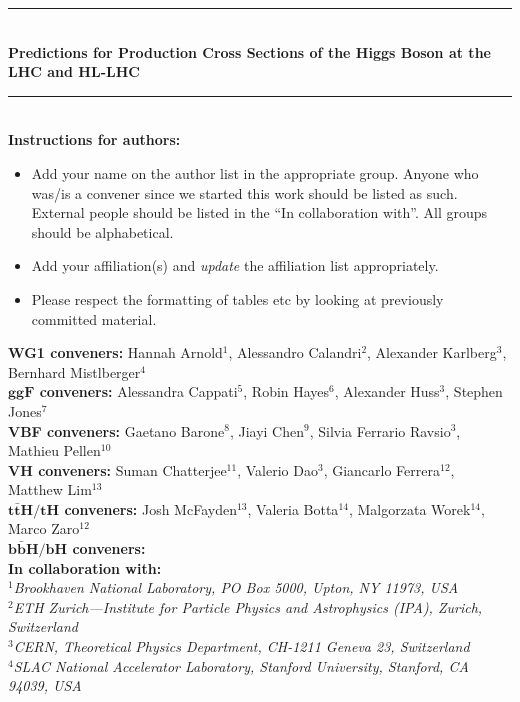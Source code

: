 \documentclass[11pt]{article}
\newcommand{\HRule}{\rule{\linewidth}{0.5mm}}
\begin{document}
\begin{titlepage}
\begin{center}
    \HRule \\[0.9cm]
    \textbf{\Large Predictions for Production Cross Sections of the Higgs Boson at the LHC and HL-LHC} \\[1.0cm]
    \HRule \\[1.5cm]
           {\bf Instructions for authors:} \begin{itemize} \item Add your name on the author list in the appropriate group. Anyone who was/is a convener since we started this work should be listed as such. External people should be listed in the ``In collaboration with''. All groups should be alphabetical. \item Add your affiliation(s) and \emph{update} the affiliation list appropriately. \item Please respect the formatting of tables etc by looking at previously committed material.\end{itemize}
	   \textrm{
             {\large {\bf WG1 conveners:} Hannah Arnold$^{1}$, Alessandro Calandri$^{2}$, Alexander Karlberg$^{3}$, Bernhard Mistlberger$^{4}$\\
               {\bf $\boldsymbol{ggF}$ conveners:}  Alessandra Cappati$^{5}$, Robin Hayes$^{6}$, Alexander Huss$^{3}$, Stephen Jones$^{7}$\\
               {\bf VBF conveners:} Gaetano Barone$^{8}$, Jiayi Chen$^{9}$, Silvia Ferrario Ravsio$^{3}$, Mathieu Pellen$^{10}$\\
               {\bf $\boldsymbol{VH}$ conveners:} Suman Chatterjee$^{11}$, Valerio Dao$^{3}$, Giancarlo Ferrera$^{12}$, Matthew Lim$^{13}$\\
               {\bf $\boldsymbol{t\bar{t}H/tH}$ conveners:} Josh McFayden$^{13}$, Valeria Botta$^{14}$, Malgorzata Worek$^{14}$, Marco Zaro$^{12}$\\
               {\bf $\boldsymbol{b\bar{b}H/bH}$ conveners:} \\
               {\bf In collaboration with:} 
           }} \\[0.3cm]	
           \textit{$^{1}$Brookhaven National Laboratory, PO Box 5000, Upton, NY 11973, USA}\\   
           \textit{$^{2}$ETH Zurich—Institute for Particle Physics and Astrophysics (IPA), Zurich, Switzerland}\\
           \textit{$^{3}$CERN, Theoretical Physics Department, CH-1211 Geneva 23, Switzerland } \\
           \textit{$^{4}$SLAC National Accelerator Laboratory, Stanford University, Stanford, CA 94039, USA } \\

\end{center}
\end{titlepage}
\end{document}
